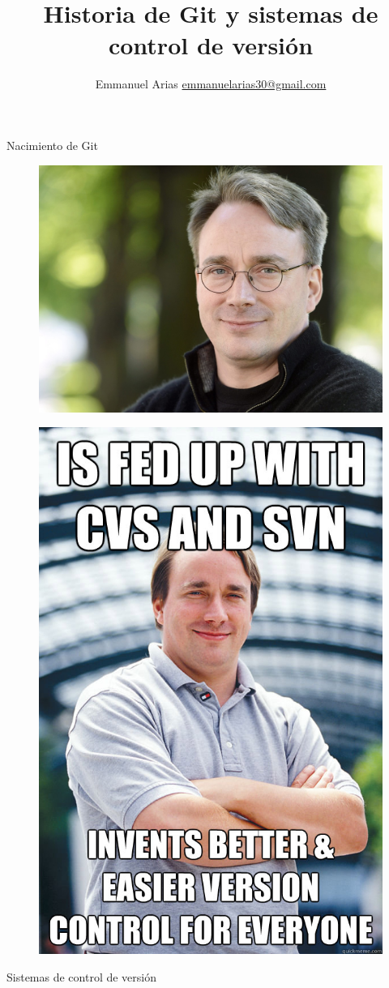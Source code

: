 \documentclass{beamer}
\title{Historia de Git y sistemas de control de versión}
\author{Emmanuel Arias \href{mailto:emmanuelarias30@gmail.com}{emmanuelarias30@gmail.com}}
\date{}
\begin{document}
\begin{frame}[plain]
    \maketitle
\end{frame}

\begin{frame}{Nacimiento de Git}
	\begin{figure}[H]
		\centering
		\includegraphics[width=0.7\linewidth]{img/LinusTorvalds}
		\label{fig:linustorvalds}
	\end{figure}
\end{frame}

\begin{frame}
	\begin{figure}
		\centering
		\includegraphics[width=0.4\linewidth]{img/genius}
		\label{fig:genius}
	\end{figure}
\end{frame}

\begin{frame}
	\Huge Sistemas de control de versión
\end{frame}
\end{document}
